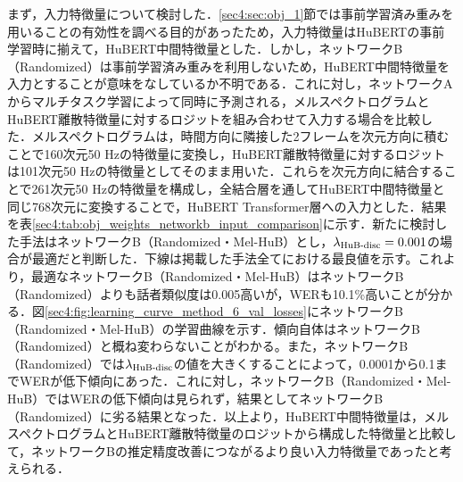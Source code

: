 まず，入力特徴量について検討した．\ref{sec4:sec:obj_1}節では事前学習済み重みを用いることの有効性を調べる目的があったため，入力特徴量はHuBERTの事前学習時に揃えて，HuBERT中間特徴量とした．しかし，ネットワークB（Randomized）は事前学習済み重みを利用しないため，HuBERT中間特徴量を入力とすることが意味をなしているか不明である．これに対し，ネットワークAからマルチタスク学習によって同時に予測される，メルスペクトログラムとHuBERT離散特徴量に対するロジットを組み合わせて入力する場合を比較した．メルスペクトログラムは，時間方向に隣接した2フレームを次元方向に積むことで160次元50 Hzの特徴量に変換し，HuBERT離散特徴量に対するロジットは101次元50 Hzの特徴量としてそのまま用いた．これらを次元方向に結合することで261次元50 Hzの特徴量を構成し，全結合層を通してHuBERT中間特徴量と同じ768次元に変換することで，HuBERT Transformer層への入力とした．結果を表\ref{sec4:tab:obj_weights_networkb_input_comparison}に示す．新たに検討した手法はネットワークB（Randomized・Mel-HuB）とし，$\lambda_{\text{HuB-disc}} = 0.001$の場合が最適だと判断した．下線は掲載した手法全てにおける最良値を示す。これより，最適なネットワークB（Randomized・Mel-HuB）はネットワークB（Randomized）よりも話者類似度は0.005高いが，WERも10.1\%高いことが分かる．図\ref{sec4:fig:learning_curve_method_6_val_losses}にネットワークB（Randomized・Mel-HuB）の学習曲線を示す．傾向自体はネットワークB（Randomized）と概ね変わらないことがわかる。また，ネットワークB（Randomized）では$\lambda_{\text{HuB-disc}}$の値を大きくすることによって，0.0001から0.1までWERが低下傾向にあった．これに対し，ネットワークB（Randomized・Mel-HuB）ではWERの低下傾向は見られず，結果としてネットワークB（Randomized）に劣る結果となった．以上より，HuBERT中間特徴量は，メルスペクトログラムとHuBERT離散特徴量のロジットから構成した特徴量と比較して，ネットワークBの推定精度改善につながるより良い入力特徴量であったと考えられる．

